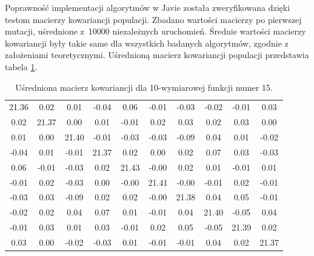 \documentclass[a4paper,onecolumn,oneside,12pt,wide,floatssmall]{mwrep}
\theoremstyle{definition}
\theoremstyle{plain}%
\theoremstyle{remark}
\begin{document}
Poprawność implementacji algorytmów w Javie została zweryfikowana dzięki testom macierzy kowariancji
populacji. Zbadano wartości macierzy po pierwszej mutacji, uśrednione z~10000 niezależnych uruchomień. 
Średnie wartości macierzy kowariancji były takie same dla wszystkich badanych algorytmów, zgodnie z 
założeniami teoretycznymi. Uśrednioną macierz kowariancji populacji przedstawia tabela 
\ref{table:cov_matrix}. 

\begin{table}[H]
\centering
\begin{tabular}{ c c c c c c c c c c }
21.36 & 0.02 & 0.01 & -0.04 & 0.06 & -0.01 & -0.03 & -0.02 & -0.01 & 0.03 \\
0.02 & 21.37 & 0.00 & 0.01 & -0.01 & 0.02 & 0.03 & 0.02 & 0.03 & 0.00 \\
0.01 & 0.00 & 21.40 & -0.01 & -0.03 & -0.03 & -0.09 & 0.04 & 0.01 & -0.02 \\
-0.04 & 0.01 & -0.01 & 21.37 & 0.02 & 0.00 & 0.02 & 0.07 & 0.03 & -0.03 \\
0.06 & -0.01 & -0.03 & 0.02 & 21.43 & -0.00 & 0.02 & 0.01 & -0.01 & 0.01 \\
-0.01 & 0.02 & -0.03 & 0.00 & -0.00 & 21.41 & -0.00 & -0.01 & 0.02 & -0.01 \\
-0.03 & 0.03 & -0.09 & 0.02 & 0.02 & -0.00 & 21.38 & 0.04 & 0.05 & -0.01 \\
-0.02 & 0.02 & 0.04 & 0.07 & 0.01 & -0.01 & 0.04 & 21.40 & -0.05 & 0.04 \\
-0.01 & 0.03 & 0.01 & 0.03 & -0.01 &  0.02 & 0.05 & -0.05 & 21.39 & 0.02 \\
0.03 & 0.00 & -0.02 & -0.03 & 0.01 & -0.01 & -0.01 &  0.04 & 0.02 & 21.37 \\
\end{tabular}
\caption{Uśredniona macierz kowariancji dla 10-wymiarowej funkcji numer 15.}
\label{table:cov_matrix}
\end{table}
\end{document}

